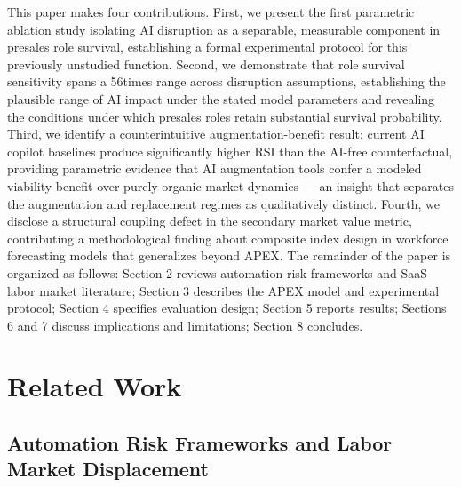 \documentclass[10pt, conference]{IEEEtran}
\begin{document}
This paper makes four contributions. First, we present the first parametric ablation study isolating AI disruption as a separable, measurable component in presales role survival, establishing a formal experimental protocol for this previously unstudied function. Second, we demonstrate that role survival sensitivity spans a 56times range across disruption assumptions, establishing the plausible range of AI impact under the stated model parameters and revealing the conditions under which presales roles retain substantial survival probability. Third, we identify a counterintuitive augmentation-benefit result: current AI copilot baselines produce significantly higher RSI than the AI-free counterfactual, providing parametric evidence that AI augmentation tools confer a modeled viability benefit over purely organic market dynamics --- an insight that separates the augmentation and replacement regimes as qualitatively distinct. Fourth, we disclose a structural coupling defect in the secondary market value metric, contributing a methodological finding about composite index design in workforce forecasting models that generalizes beyond APEX. The remainder of the paper is organized as follows: Section 2 reviews automation risk frameworks and SaaS labor market literature; Section 3 describes the APEX model and experimental protocol; Section 4 specifies evaluation design; Section 5 reports results; Sections 6 and 7 discuss implications and limitations; Section 8 concludes.

\section{Related Work}

\label{sec:related\_work}

\subsection{Automation Risk Frameworks and Labor Market Displacement}

\label{sec:automation\_risk\_frameworks\_and\_labor\_mar}
\end{document}
